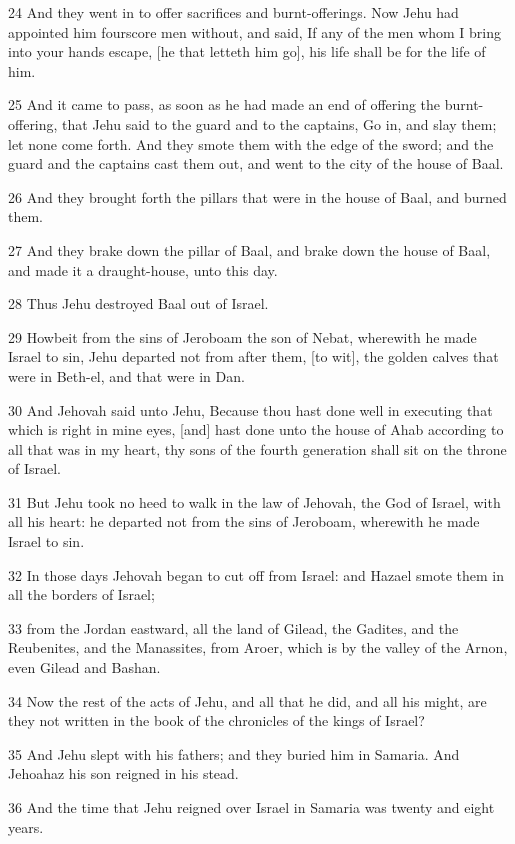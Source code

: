 \par 24 And they went in to offer sacrifices and burnt-offerings. Now Jehu had appointed him fourscore men without, and said, If any of the men whom I bring into your hands escape, [he that letteth him go], his life shall be for the life of him.
\par 25 And it came to pass, as soon as he had made an end of offering the burnt-offering, that Jehu said to the guard and to the captains, Go in, and slay them; let none come forth. And they smote them with the edge of the sword; and the guard and the captains cast them out, and went to the city of the house of Baal.
\par 26 And they brought forth the pillars that were in the house of Baal, and burned them.
\par 27 And they brake down the pillar of Baal, and brake down the house of Baal, and made it a draught-house, unto this day.
\par 28 Thus Jehu destroyed Baal out of Israel.
\par 29 Howbeit from the sins of Jeroboam the son of Nebat, wherewith he made Israel to sin, Jehu departed not from after them, [to wit], the golden calves that were in Beth-el, and that were in Dan.
\par 30 And Jehovah said unto Jehu, Because thou hast done well in executing that which is right in mine eyes, [and] hast done unto the house of Ahab according to all that was in my heart, thy sons of the fourth generation shall sit on the throne of Israel.
\par 31 But Jehu took no heed to walk in the law of Jehovah, the God of Israel, with all his heart: he departed not from the sins of Jeroboam, wherewith he made Israel to sin.
\par 32 In those days Jehovah began to cut off from Israel: and Hazael smote them in all the borders of Israel;
\par 33 from the Jordan eastward, all the land of Gilead, the Gadites, and the Reubenites, and the Manassites, from Aroer, which is by the valley of the Arnon, even Gilead and Bashan.
\par 34 Now the rest of the acts of Jehu, and all that he did, and all his might, are they not written in the book of the chronicles of the kings of Israel?
\par 35 And Jehu slept with his fathers; and they buried him in Samaria. And Jehoahaz his son reigned in his stead.
\par 36 And the time that Jehu reigned over Israel in Samaria was twenty and eight years.

